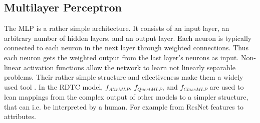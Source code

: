 \documentclass[a4paper,cleardoubleempty,BCOR1cm, 11pt]{report}
\begin{document}
\subsection{Multilayer Perceptron}\label{sec:MLP}
The MLP is a rather simple architecture. It consists of an input layer, an arbitrary number of hidden layers, and an output layer. Each neuron is typically connected to each neuron in the next layer through weighted connections. Thus each neuron gets the weighted output from the last layer's neurons as input. Non-linear activation functions allow the network to learn not linearly separable problems. Their rather simple structure and effectiveness make them a widely used tool \cite{beale1990neural}. In the RDTC model, $f_{AttrMLP}$, $f_{QuestMLP}$, and $f_{ClassMLP}$ are used to lean mappings from the complex output of other models to a simpler structure, that can i.e. be interpreted by a human. For example from ResNet features to attributes.
\end{document}
